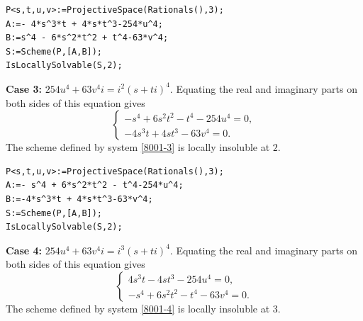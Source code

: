 \documentclass[a4paper,12pt,english,reqno]{amsart}
\begin{document}


\begin{lstlisting}
P<s,t,u,v>:=ProjectiveSpace(Rationals(),3);
A:=- 4*s^3*t + 4*s*t^3-254*u^4;
B:=s^4 - 6*s^2*t^2 + t^4-63*v^4;
S:=Scheme(P,[A,B]);
IsLocallySolvable(S,2);
\end{lstlisting}

{\bf Case 3:} $254u^4+63v^4i=i^2(s+ti)^4$. Equating the real and imaginary parts on both sides of this equation gives
\begin{equation}\label{8001-3}
\begin{cases}
-s^4 + 6s^2t^2 - t^4 -254u^4=0,\\
-4s^3t + 4st^3 - 63v^4=0.
\end{cases}
\end{equation}
The scheme defined by system \eqref{8001-3} is locally insoluble at $2$.

\begin{lstlisting}
P<s,t,u,v>:=ProjectiveSpace(Rationals(),3);
A:=- s^4 + 6*s^2*t^2 - t^4-254*u^4;
B:=-4*s^3*t + 4*s*t^3-63*v^4;
S:=Scheme(P,[A,B]);
IsLocallySolvable(S,2);
\end{lstlisting}


{\bf Case 4:} $254u^4+63v^4i=i^3(s+ti)^4$. Equating the real and imaginary parts on both sides of this equation gives
\begin{equation}\label{8001-4}
\begin{cases}
4s^3t - 4st^3 -254u^4=0,\\
-s^4 + 6s^2t^2 - t^4 - 63v^4=0.
\end{cases}
\end{equation}
The scheme defined by system \eqref{8001-4} is locally insoluble at $3$.

\end{document}
